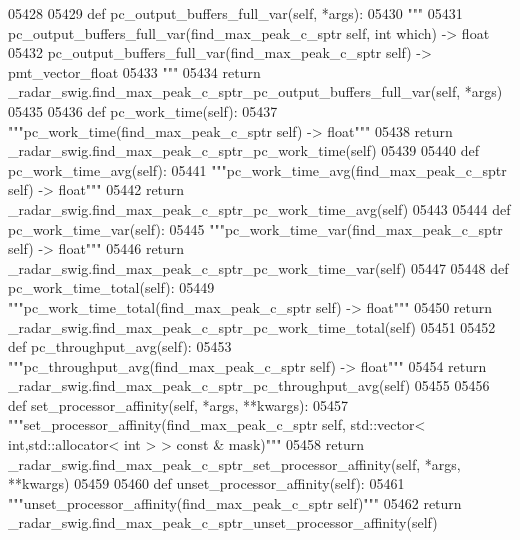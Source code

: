 \begin{DoxyCode}
{{{{{{{{{{{{{{{{{{05428 
05429     \textcolor{keyword}{def }pc_output_buffers_full_var(self, *args):
05430         \textcolor{stringliteral}{"""}
05431 \textcolor{stringliteral}{        pc\_output\_buffers\_full\_var(find\_max\_peak\_c\_sptr self, int which) -> float}
05432 \textcolor{stringliteral}{        pc\_output\_buffers\_full\_var(find\_max\_peak\_c\_sptr self) -> pmt\_vector\_float}
05433 \textcolor{stringliteral}{        """}
05434         \textcolor{keywordflow}{return} \_radar\_swig.find\_max\_peak\_c\_sptr\_pc\_output\_buffers\_full\_var(self, *args)
05435 
05436     \textcolor{keyword}{def }pc_work_time(self):
05437         \textcolor{stringliteral}{"""pc\_work\_time(find\_max\_peak\_c\_sptr self) -> float"""}
05438         \textcolor{keywordflow}{return} \_radar\_swig.find\_max\_peak\_c\_sptr\_pc\_work\_time(self)
05439 
05440     \textcolor{keyword}{def }pc_work_time_avg(self):
05441         \textcolor{stringliteral}{"""pc\_work\_time\_avg(find\_max\_peak\_c\_sptr self) -> float"""}
05442         \textcolor{keywordflow}{return} \_radar\_swig.find\_max\_peak\_c\_sptr\_pc\_work\_time\_avg(self)
05443 
05444     \textcolor{keyword}{def }pc_work_time_var(self):
05445         \textcolor{stringliteral}{"""pc\_work\_time\_var(find\_max\_peak\_c\_sptr self) -> float"""}
05446         \textcolor{keywordflow}{return} \_radar\_swig.find\_max\_peak\_c\_sptr\_pc\_work\_time\_var(self)
05447 
05448     \textcolor{keyword}{def }pc_work_time_total(self):
05449         \textcolor{stringliteral}{"""pc\_work\_time\_total(find\_max\_peak\_c\_sptr self) -> float"""}
05450         \textcolor{keywordflow}{return} \_radar\_swig.find\_max\_peak\_c\_sptr\_pc\_work\_time\_total(self)
05451 
05452     \textcolor{keyword}{def }pc_throughput_avg(self):
05453         \textcolor{stringliteral}{"""pc\_throughput\_avg(find\_max\_peak\_c\_sptr self) -> float"""}
05454         \textcolor{keywordflow}{return} \_radar\_swig.find\_max\_peak\_c\_sptr\_pc\_throughput\_avg(self)
05455 
05456     \textcolor{keyword}{def }set_processor_affinity(self, *args, **kwargs):
05457         \textcolor{stringliteral}{"""set\_processor\_affinity(find\_max\_peak\_c\_sptr self, std::vector< int,std::allocator< int > > const
       & mask)"""}
05458         \textcolor{keywordflow}{return} \_radar\_swig.find\_max\_peak\_c\_sptr\_set\_processor\_affinity(self, *args, **kwargs)
05459 
05460     \textcolor{keyword}{def }unset_processor_affinity(self):
05461         \textcolor{stringliteral}{"""unset\_processor\_affinity(find\_max\_peak\_c\_sptr self)"""}
05462         \textcolor{keywordflow}{return} \_radar\_swig.find\_max\_peak\_c\_sptr\_unset\_processor\_affinity(self)
}}}}}}}}}}}}}}}}}}
\end{DoxyCode}

